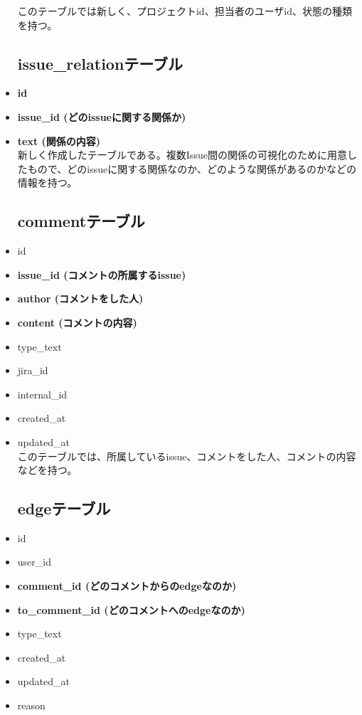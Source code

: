 \documentclass[12pt, oneside]{jreport}
\begin{document}
\begin{itemize}
		このテーブルでは新しく、プロジェクトid、担当者のユーザid、状態の種類を持つ。
		
		\subsection{issue\_relationテーブル}
		\item {\bf id}
		\item {\bf issue\_id (どのissueに関する関係か)}
		\item {\bf text (関係の内容)} \\
		
		新しく作成したテーブルである。複数Issue間の関係の可視化のために用意したもので、どのissueに関する関係なのか、どのような関係があるのかなどの情報を持つ。

		\subsection{commentテーブル}
		\item id
		\item {\bf issue\_id (コメントの所属するissue)}
		\item {\bf author (コメントをした人)}
		\item {\bf content (コメントの内容)}
		\item type\_text
		\item jira\_id
		\item internal\_id
		\item created\_at
		\item updated\_at \\
		
		このテーブルでは、所属しているissue、コメントをした人、コメントの内容などを持つ。

		\subsection{edgeテーブル}
		\item id
		\item user\_id
		\item {\bf comment\_id (どのコメントからのedgeなのか)}
		\item {\bf to\_comment\_id (どのコメントへのedgeなのか)}
		\item type\_text
		\item created\_at
		\item updated\_at
		\item reason \\


\end{itemize}
\end{document}

